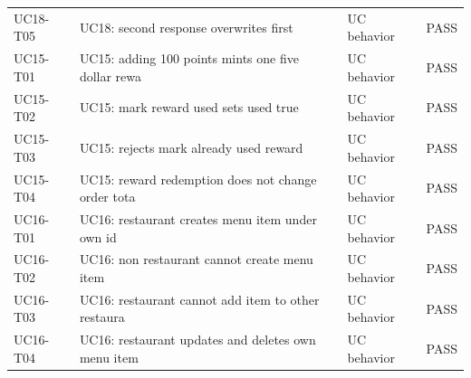\begin{table}[t]
\begin{tabular}{p{3.8cm}p{3.6cm}p{2.8cm}p{2.0cm}}
UC18-T05 & UC18: second response overwrites first & UC behavior & PASS \\
UC15-T01 & UC15: adding 100 points mints one five dollar rewa & UC behavior & PASS \\
UC15-T02 & UC15: mark reward used sets used true & UC behavior & PASS \\
UC15-T03 & UC15: rejects mark already used reward & UC behavior & PASS \\
UC15-T04 & UC15: reward redemption does not change order tota & UC behavior & PASS \\
UC16-T01 & UC16: restaurant creates menu item under own id & UC behavior & PASS \\
UC16-T02 & UC16: non restaurant cannot create menu item & UC behavior & PASS \\
UC16-T03 & UC16: restaurant cannot add item to other restaura & UC behavior & PASS \\
UC16-T04 & UC16: restaurant updates and deletes own menu item & UC behavior & PASS \\
\bottomrule
\end{tabular}
\end{table}

